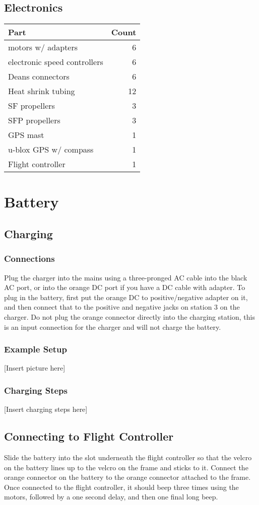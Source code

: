 \documentclass{style}
\begin{document}
\subsection{Electronics}
\begin{tabular}{|l|r|}
  \hline
  \textbf{Part} & \textbf{Count} \\
  \hline
  motors w/ adapters & 6 \\
  \hline
  electronic speed controllers & 6 \\
  \hline
  Deans connectors & 6 \\
  \hline
  Heat shrink tubing & 12 \\
  \hline
  SF propellers & 3 \\
  \hline
  SFP propellers & 3 \\
  \hline
  GPS mast & 1 \\
  \hline
  u-blox GPS w/ compass & 1 \\
  \hline
  Flight controller & 1 \\
  \hline
\end{tabular}
\section{Battery}
\subsection{Charging}
\subsubsection{Connections}
Plug the charger into the mains using a three-pronged AC cable into the black AC port, or into the orange DC port if you have a DC cable with adapter.
To plug in the battery, first put the orange DC to positive/negative adapter on it, and then connect that to the positive and negative jacks on station 3 on the charger.
Do not plug the orange connector directly into the charging station, this is an input connection for the charger and will not charge the battery.
\subsubsection{Example Setup}
[Insert picture here]
\subsubsection{Charging Steps}
[Insert charging steps here]
\subsection{Connecting to Flight Controller}
Slide the battery into the slot underneath the flight controller so that the velcro on the battery lines up to the velcro on the frame and sticks to it.
Connect the orange connector on the battery to the orange connector attached to the frame.
Once connected to the flight controller, it should beep three times using the motors, followed by a one second delay, and then one final long beep.
\end{document}
